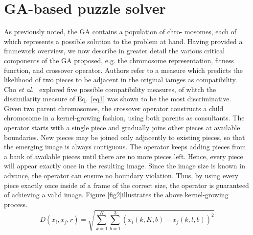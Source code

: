 \documentclass[10pt,twocolumn,letterpaper]{article}
\begin{document}
\section{GA-based puzzle solver}
As previously noted, the GA contains a population of chro- mosomes, each of which represents a possible solution to the problem at hand. Having provided a framework overview, we now describe in greater detail the various critical components of the GA proposed, e.g. the chromosome representation, fitness function, and crossover operator. Authors refer to a measure which predicts the likelihood of two pieces to be adjacent in the original iamges as compatibility. Cho \emph{et al.}~\cite{Probabilistic} explored five possible compatibility measures, of whtch the dissimilarity measure of Eq.~\ref{eq1} was shown to be the most discriminative. \\
\indent Given two parent chromosomes, the crossover operator constructs a child chromosome in a kernel-growing fashion, using both parents as consultants. The operator starts with a single piece and gradually joins other pieces at available boundaries. New pieces may be joined only adjacently to existing pieces, so that the emerging image is always contiguous. The operator keeps adding pieces from a bank of available pieces until there are no more pieces left. Hence, every piece will appear exactly once in the resulting image. Since the image size is known in advance, the operator can ensure no boundary violation. Thus, by using every piece exactly once inside of a frame of the correct size, the operator is guaranteed of achieving a valid image. Figure \ref{fig2}illustrates the above kernel-growing process.
\begin{equation}
D(x_i,x_j,r) = \sqrt{\sum_{k=1}^K \sum_{b=1}^3(x_i(k,K,b) - x_j(k,l,b))^2}
\label{eq1}
\end{equation}


{\small


}
\end{document}
